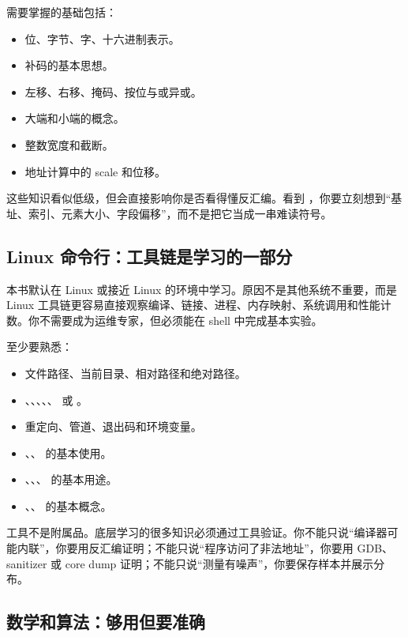 需要掌握的基础包括：

\begin{itemize}
  \item 位、字节、字、十六进制表示。
  \item 补码的基本思想。
  \item 左移、右移、掩码、按位与或异或。
  \item 大端和小端的概念。
  \item 整数宽度和截断。
  \item 地址计算中的 scale 和位移。
\end{itemize}

这些知识看似低级，但会直接影响你是否看得懂反汇编。看到 ，你要立刻想到“基址、索引、元素大小、字段偏移”，而不是把它当成一串难读符号。

\subsection{Linux 命令行：工具链是学习的一部分}

本书默认在 Linux 或接近 Linux 的环境中学习。原因不是其他系统不重要，而是 Linux 工具链更容易直接观察编译、链接、进程、内存映射、系统调用和性能计数。你不需要成为运维专家，但必须能在 shell 中完成基本实验。

至少要熟悉：

\begin{itemize}
  \item 文件路径、当前目录、相对路径和绝对路径。
  \item {}、、、、、 或 。
  \item 重定向、管道、退出码和环境变量。
  \item {}、、 的基本使用。
  \item {}、、、 的基本用途。
  \item {}、、 的基本概念。
\end{itemize}

工具不是附属品。底层学习的很多知识必须通过工具验证。你不能只说“编译器可能内联”，你要用反汇编证明；不能只说“程序访问了非法地址”，你要用 GDB、sanitizer 或 core dump 证明；不能只说“测量有噪声”，你要保存样本并展示分布。

\subsection{数学和算法：够用但要准确}

